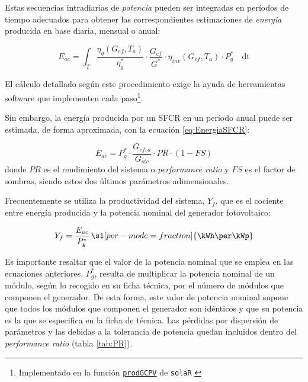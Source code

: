 Estas secuencias intradiarias de \emph{potencia} pueden ser integradas en períodos de
tiempo adecuados para obtener las correspondientes estimaciones de
\emph{energía} producida en base diaria, mensual o anual:

\begin{equation}
  E_{ac} = \int_T \frac{\eta_g(G_{ef}, T_a)}{\eta_g^*} \cdot
  \frac{G_{ef}}{G^*} \cdot \eta_{inv}(G_{ef}, T_a) \cdot P_g^*\quad \mathrm{dt}  
\end{equation}

El cálculo detallado según este procedimiento exige la ayuda de
herramientas software que implementen cada paso\footnote{Implementado en la
  función \href{http://search.r-project.org/R/library/solaR/html/prodGCPV.html}{\texttt{prodGCPV}} de \texttt{solaR} \cite{Perpinan2012b}}.

Sin embargo, la energía producida por un SFCR en un período anual puede ser estimada,
de forma aproximada, con la ecuación \ref{eq:EnergiaSFCR}:

\begin{equation}
  E_{ac}=P_{g}^{*}\cdot\frac{G_{ef,a}}{G_{stc}} \cdot PR \cdot (1-FS)
  \label{eq:EnergiaSFCR}
\end{equation}
donde $PR$ es el rendimiento del sistema o \emph{performance ratio }y $FS$ es el factor de sombras, siendo estos dos últimos parámetros adimensionales.

Frecuentemente se utiliza la productividad del sistema, $Y_{f}$, que
es el cociente entre energía producida y la potencia nominal del
generador fotovoltaico: 

\begin{equation}
  Y_{f}=\frac{E_{ac}}{P_{g}^{*}}\,\si[per-mode=fraction]{\kWh\per\kWp}
\end{equation}


Es importante resaltar que el valor de la potencia nominal que se
emplea en las ecuaciones anteriores, $P_g^*$, resulta de multiplicar
la potencia nominal de un módulo, según lo recogido en su ficha
técnica, por el número de módulos que componen el generador. De esta
forma, este valor de potencia nominal supone que todos los módulos que
componen el generador son idénticos y que su potencia es la que se especifica en la ficha de
técnica. Las pérdidas por dispersión de parámetros y las
debidas a la tolerancia de potencia quedan incluidos dentro del
\emph{performance ratio} (tabla \ref{tab:PR}).


